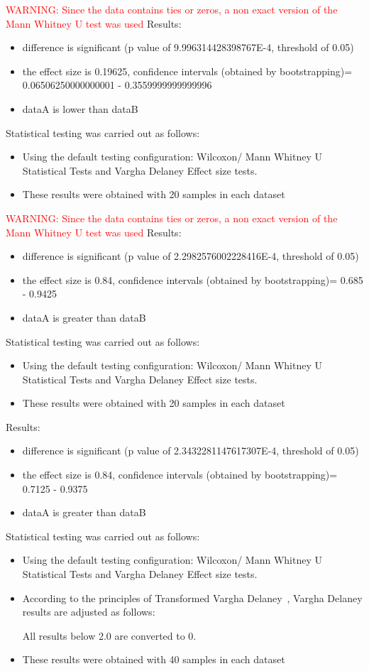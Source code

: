 \documentclass[]{article}
\begin{document}
\textcolor{Red}{WARNING: Since the data contains ties or zeros, a non exact version of the Mann Whitney U test was used
}
Results:
\begin{itemize}
\item{difference is significant (p value of 9.996314428398767E-4, threshold of 0.05)}
\item{the effect size is 0.19625, confidence intervals (obtained by bootstrapping)= 0.06506250000000001 - 0.3559999999999996}
\item{dataA is lower than dataB}
\end{itemize}Statistical testing was carried out as follows: \begin{itemize}
\item{Using the default testing configuration: Wilcoxon/ Mann Whitney U Statistical Tests and Vargha Delaney Effect size tests.}
\item{These results were obtained with 20 samples in each dataset}
\end{itemize}
\textcolor{Red}{WARNING: Since the data contains ties or zeros, a non exact version of the Mann Whitney U test was used
}
Results:
\begin{itemize}
\item{difference is significant (p value of 2.2982576002228416E-4, threshold of 0.05)}
\item{the effect size is 0.84, confidence intervals (obtained by bootstrapping)= 0.685 - 0.9425}
\item{dataA is greater than dataB}
\end{itemize}Statistical testing was carried out as follows: \begin{itemize}
\item{Using the default testing configuration: Wilcoxon/ Mann Whitney U Statistical Tests and Vargha Delaney Effect size tests.}
\item{These results were obtained with 20 samples in each dataset}
\end{itemize}Results:
\begin{itemize}
\item{difference is significant (p value of 2.3432281147617307E-4, threshold of 0.05)}
\item{the effect size is 0.84, confidence intervals (obtained by bootstrapping)= 0.7125 - 0.9375}
\item{dataA is greater than dataB}
\end{itemize}Statistical testing was carried out as follows: \begin{itemize}
\item{Using the default testing configuration: Wilcoxon/ Mann Whitney U Statistical Tests and Vargha Delaney Effect size tests.}
\item{According to the principles of Transformed Vargha Delaney~\cite{Neumann2015}, Vargha Delaney results are adjusted as follows:
 
All results below 2.0 are converted to 0.}
\item{These results were obtained with 40 samples in each dataset}
\end{itemize}
\end{document}
